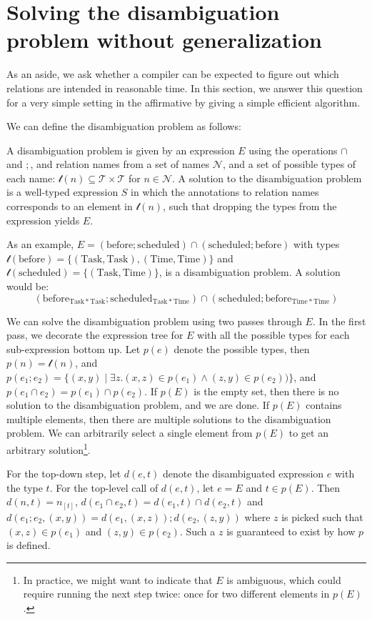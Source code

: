\documentclass[12pt]{article}
\begin{document}
\section{Solving the disambiguation problem without generalization}
As an aside, we ask whether a compiler can be expected to figure out which relations are intended in reasonable time. In this section, we answer this question for a very simple setting in the affirmative by giving a simple efficient algorithm.

We can define the disambiguation problem as follows:

A disambiguation problem is given by an expression $E$ using the operations $\cap$ and $;$, and relation names from a set of names $\mathcal{N}$, and a set of possible types of each name: $\mathcal{t}(n) \subseteq \mathcal{T}\times \mathcal{T}$ for $n\in \mathcal{N}$.
A solution to the disambiguation problem is a well-typed expression $S$ in which the annotations to relation names corresponds to an element in $\mathcal{t}(n)$, such that dropping the types from the expression yields $E$.

As an example, $E = (\mathrm{before};\mathrm{scheduled}) \cap (\mathrm{scheduled};\mathrm{before})$ with types $\mathcal{t}(\mathrm{before}) = \{(\mathrm{Task}, \mathrm{Task}),(\mathrm{Time}, \mathrm{Time})\}$ and $\mathcal{t}(\mathrm{scheduled}) = \{(\mathrm{Task}, \mathrm{Time})\}$, is a disambiguation problem.
A solution would be:
\[\left(\mathrm{before}_{\mathrm{Task * Task}};\mathrm{scheduled}_{\mathrm{Task * Time}}\right) \cap \left(\mathrm{scheduled};\mathrm{before}_{\mathrm{Time * Time}}\right)\]

We can solve the disambiguation problem using two passes through $E$.
In the first pass, we decorate the expression tree for $E$ with all the possible types for each sub-expression bottom up.
Let $p(e)$ denote the possible types, then $p(n) = \mathcal{t}(n)$, and $p(e_1;e_2) = \{(x,y) \mid \exists z. (x,z) \in p(e_1) \wedge (z,y) \in p(e_2))\}$, and $p(e_1 \cap e_2) = p(e_1) \cap p(e_2)$.
If $p(E)$ is the empty set, then there is no solution to the disambiguation problem, and we are done.
If $p(E)$ contains multiple elements, then there are multiple solutions to the disambiguation problem.
We can arbitrarily select a single element from $p(E)$ to get an arbitrary solution\footnote{In practice, we might want to indicate that $E$ is ambiguous, which could require running the next step twice: once for two different elements in $p(E)$.}.

For the top-down step, let $d(e,t)$ denote the disambiguated expression $e$ with the type $t$.
For the top-level call of $d(e,t)$, let $e=E$ and $t\in p(E)$.
Then $d(n,t) = n_{[t]}$, $d(e_1 \cap e_2, t) = d(e_1,t) \cap d(e_2,t)$ and $d(e_1 ; e_2, (x,y)) = d(e_1, (x,z)) ; d(e_2, (z,y))$ where $z$ is picked such that $(x,z)\in p(e_1)$ and $(z,y)\in p(e_2)$.
Such a $z$ is guaranteed to exist by how $p$ is defined.
\end{document}

